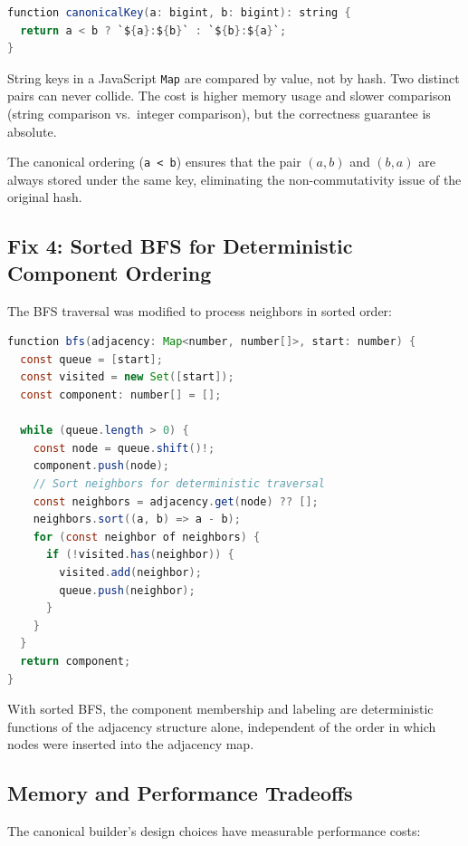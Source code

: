 \documentclass{../yalumba}
\begin{document}
\begin{lstlisting}[language=Java,caption={Collision-free string keys.}]
function canonicalKey(a: bigint, b: bigint): string {
  return a < b ? `${a}:${b}` : `${b}:${a}`;
}
\end{lstlisting}

String keys in a JavaScript \texttt{Map} are compared by value, not by hash.
Two distinct pairs can never collide. The cost is higher memory usage and slower
comparison (string comparison vs.\ integer comparison), but the correctness
guarantee is absolute.

The canonical ordering (\texttt{a < b}) ensures that the pair $(a, b)$ and
$(b, a)$ are always stored under the same key, eliminating the non-commutativity
issue of the original hash.

\subsection{Fix 4: Sorted BFS for Deterministic Component Ordering}

The BFS traversal was modified to process neighbors in sorted order:

\begin{lstlisting}[language=Java,caption={Sorted BFS for deterministic components.}]
function bfs(adjacency: Map<number, number[]>, start: number) {
  const queue = [start];
  const visited = new Set([start]);
  const component: number[] = [];

  while (queue.length > 0) {
    const node = queue.shift()!;
    component.push(node);
    // Sort neighbors for deterministic traversal
    const neighbors = adjacency.get(node) ?? [];
    neighbors.sort((a, b) => a - b);
    for (const neighbor of neighbors) {
      if (!visited.has(neighbor)) {
        visited.add(neighbor);
        queue.push(neighbor);
      }
    }
  }
  return component;
}
\end{lstlisting}

With sorted BFS, the component membership and labeling are deterministic
functions of the adjacency structure alone, independent of the order in which
nodes were inserted into the adjacency map.

\subsection{Memory and Performance Tradeoffs}

The canonical builder's design choices have measurable performance costs:
\end{document}
